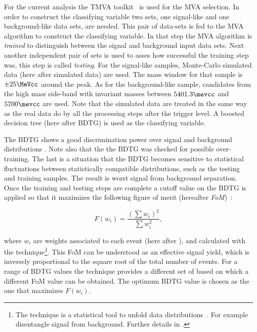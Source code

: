 For the current analysis the TMVA toolkit~\cite{TMVA} is used for the MVA selection. In order to construct the classifying variable 
two sets, one signal-like and one background-like data sets, are needed. This pair of data-sets is fed to the MVA algorithm 
to construct the classifying variable. In that step the MVA algorithm is {\it trained} to distinguish between the signal 
and background input data sets. Next another independent pair of sets is used to asses how successful the training step was, this step is called {\it testing}. 
For the signal-like samples, \BsJpsiKst Monte-Carlo simulated data (here after simulated data)
are used. The \Bs mass window for that sample is $\pm 25 \MeVcc$ around the \Bs peak. As for the background-like sample, candidates from the high mass side-band
with invariant masses between $5401.3\mevcc$ and $5700\mevcc$ are used. Note that the simulated data are treated in the same way as
the real data do by all the processing steps after the \lone trigger level. A boosted decision tree (here after BDTG) is used as the classifying variable. 

The BDTG shows a good discrimination power over signal and background distributions . Note also that the the
BDTG was checked for possible over-training. The last is a situation that the BDTG becomes sensitive to statistical fluctuations between
statistically compatible distributions, such as the testing and training samples. The result is worst signal from background separation.
Once the training and testing steps are complete a cutoff value on the BDTG is applied so that it maximizes the following figure of merit
(hereafter {\it FoM})~\cite{Yuehong_fom}:

\begin{equation}
\label{eqn:fom}
F(w_i) = \frac{\left(\sum{w_{i}}\right)^2}{\sum{w_{i}^2}},
\end{equation}

\noindent where $w_i$ are weights associated to each event (here after \sWeights), and calculated with the \sPlot 
technique\footnote{The \sPlot technique is a statistical tool to unfold data distributions~\cite{splot}. 
For example disentangle signal from background. Further details in . }.
This FoM can be understood as an effective signal yield, which is inversely proportional to the square root of the total number of events.
For a range of BDTG values the \sPlot technique provides a different set of \sWeights based on which a different FoM value can be obtained. 
The optimum BDTG value is chosen as the one that maximizes $F(w_i)$.

